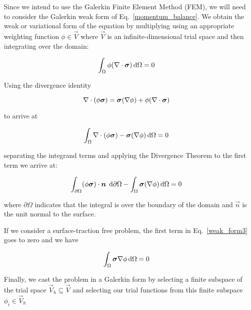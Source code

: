 Since we intend to use the Galerkin Finite Element Method (FEM), we will need to consider the Galerkin weak form of Eq.\ \eqref{momentum_balance}. We obtain the weak or variational form of the equation by multiplying using an appropriate weighting function $\phi \in \vec{V}$ where $\vec{V}$ is an infinite-dimensional trial space and then integrating over the domain:

%
\begin{equation}
\int_\Omega \phi(\nabla \cdot \bm{\sigma}) \mathop{}\!\mathrm{d} \Omega = 0
\label{weak_form1}
\end{equation}
%

Using the divergence identity 

%
\begin{equation}
\nabla \cdot (\phi \bm{\sigma}) = \bm{\sigma} (\nabla \phi) + \phi (\nabla \cdot \bm{\sigma}) \nonumber
\end{equation}
%

to arrive at 

%
\begin{equation}
\int_\Omega \nabla \cdot (\phi \bm{\sigma}) - \bm{\sigma} (\nabla \phi) \mathop{}\!\mathrm{d} \Omega = 0
\label{weak_form2}
\end{equation}
%

separating the integrand terms and applying the Divergence Theorem to the first term we arrive at:

%
\begin{equation}
\int_{\partial \Omega} (\phi \bm{\sigma}) \cdot \bm{n} \; \mathop{}\!\mathrm{d} \partial \Omega - \int_\Omega \bm{\sigma} (\nabla \phi) \mathop{}\!\mathrm{d} \Omega = 0
\label{weak_form3}
\end{equation}
%

where $\partial \Omega$ indicates that the integral is over the boundary of the domain and $\vec{n}$ is the unit normal to the surface.

If we consider a surface-traction free problem, the first term in Eq.\ \eqref{weak_form3} goes to zero and we have

%
\begin{equation}
\int_\Omega \bm{\sigma} \nabla \phi \mathop{}\!\mathrm{d} \Omega = 0
\label{weak_form}
\end{equation}
%

Finally, we cast the problem in a Galerkin form by selecting a finite subspace of the trial space $\vec{V}_h \subseteq \vec{V}$ and selecting our trial functions from this finite subspace $\phi_i \in \vec{V}_h$

